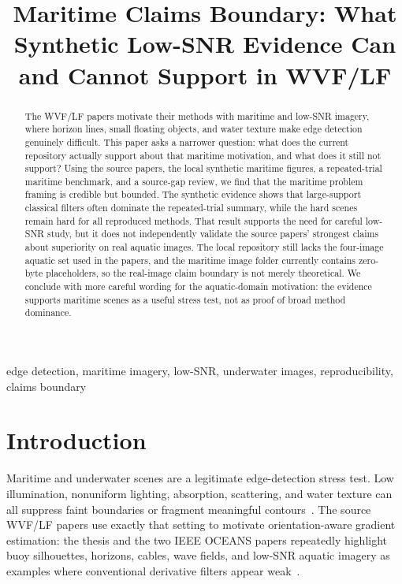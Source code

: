 \documentclass[conference]{IEEEtran}
\begin{document}
\title{Maritime Claims Boundary: What Synthetic Low-SNR Evidence Can and Cannot Support in WVF/LF}

\author{
}

\maketitle

\begin{abstract}
The WVF/LF papers motivate their methods with maritime and low-SNR imagery, where horizon lines, small floating objects, and water texture make edge detection genuinely difficult. This paper asks a narrower question: what does the current repository actually support about that maritime motivation, and what does it still not support? Using the source papers, the local synthetic maritime figures, a repeated-trial maritime benchmark, and a source-gap review, we find that the maritime problem framing is credible but bounded. The synthetic evidence shows that large-support classical filters often dominate the repeated-trial summary, while the hard scenes remain hard for all reproduced methods. That result supports the need for careful low-SNR study, but it does not independently validate the source papers' strongest claims about superiority on real aquatic images. The local repository still lacks the four-image aquatic set used in the papers, and the maritime image folder currently contains zero-byte placeholders, so the real-image claim boundary is not merely theoretical. We conclude with more careful wording for the aquatic-domain motivation: the evidence supports maritime scenes as a useful stress test, not as proof of broad method dominance.
\end{abstract}

\begin{IEEEkeywords}
edge detection, maritime imagery, low-SNR, underwater images, reproducibility, claims boundary
\end{IEEEkeywords}

\section{Introduction}
Maritime and underwater scenes are a legitimate edge-detection stress test. Low illumination, nonuniform lighting, absorption, scattering, and water texture can all suppress faint boundaries or fragment meaningful contours~\cite{marques2019,ji2023}. The source WVF/LF papers use exactly that setting to motivate orientation-aware gradient estimation: the thesis and the two IEEE OCEANS papers repeatedly highlight buoy silhouettes, horizons, cables, wave fields, and low-SNR aquatic imagery as examples where conventional derivative filters appear weak~\cite{bagan2023thesis,bagan2024oceans,bagan2025oceans}.
\end{document}
